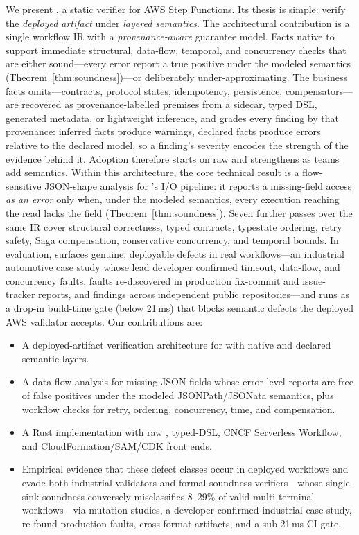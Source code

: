 We present \tool{}, a static verifier for AWS Step Functions. Its thesis is simple: verify the
\emph{deployed artifact} under \emph{layered semantics}. The architectural contribution is a single
workflow IR with a \emph{provenance-aware} guarantee model. Facts native to \asl{} support
immediate structural, data-flow, temporal, and concurrency checks that are either sound---every error
report a true positive under the modeled semantics (Theorem~\ref{thm:soundness})---or deliberately under-approximating. The business facts
\asl{} omits---contracts, protocol states,
idempotency, persistence, compensators---are recovered as provenance-labelled premises from a
sidecar, typed DSL, generated metadata, or lightweight inference, and \tool{} grades every finding
by that provenance: inferred facts produce warnings, declared facts produce errors relative to the
declared model, so a finding's severity encodes the strength of the evidence behind it. Adoption
therefore starts on raw \asl{} and strengthens as teams add semantics.
Within this architecture, the core technical result is a flow-sensitive JSON-shape analysis for
\asl{}'s I/O pipeline: it reports a missing-field access \emph{as an error} only when, under the modeled semantics,  every execution reaching the
read lacks the field (Theorem~\ref{thm:soundness}). Seven further passes over the same IR cover
structural correctness, typed contracts, typestate ordering, retry safety, Saga compensation,
conservative concurrency, and temporal bounds.
In evaluation, \tool{} surfaces genuine, deployable defects in real workflows---an industrial
automotive case study whose lead developer confirmed timeout, data-flow, and concurrency faults,
faults re-discovered in production fix-commit and issue-tracker reports, and findings across
independent public repositories---and runs as a drop-in build-time gate (below 21\,ms) that blocks
semantic defects the deployed AWS validator accepts. Our contributions are:

\begin{itemize}
  \setlength{\itemsep}{1pt}
  \item A deployed-artifact verification architecture for \asl{} with native and declared semantic layers.
\item A data-flow analysis for missing JSON fields whose
error-level reports are free of false positives under the
modeled JSONPath/JSONata semantics, plus workflow checks for
retry, ordering, concurrency, time, and compensation. 
  \item A Rust implementation with raw \asl{}, typed-DSL, CNCF Serverless Workflow, and CloudFormation/SAM/CDK front ends.
  \item Empirical evidence that these defect classes occur in deployed
workflows and evade both industrial validators and formal soundness
verifiers---whose single-sink soundness conversely misclassifies
8--29\% of valid multi-terminal workflows---via mutation studies, a
developer-confirmed industrial case study, re-found production faults,
cross-format artifacts, and a sub-21\,ms CI gate.
\end{itemize}
